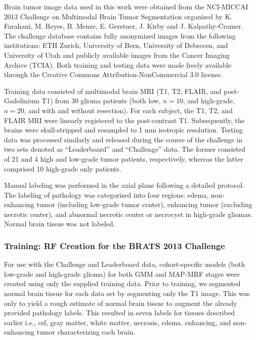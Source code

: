 Brain tumor image data used in this work were obtained from the NCI-MICCAI 2013 
Challenge on Multimodal Brain Tumor Segmentation
organized by K. Farahani, M. Reyes, B. Menze, E. Gerstner, J. Kirby and J. Kalpathy-Cramer. 
The challenge database contains fully anonymized images from the following institutions: 
ETH Zurich, University of Bern, University of Debrecen, and University of Utah and 
publicly available images from the Cancer Imaging Archive (TCIA).  Both training 
and testing data were made freely available through the Creative Commons Attribution-NonCommercial 3.0 license.

Training data consisted of multimodal brain MRI (T1, T2, FLAIR, and 
post-Gadolinium T1) from 30 glioma patients (both low, $n=10$, and high-grade, $n=20$,
and with and without resection).  For each subject, the T1, T2, and 
FLAIR MRI were linearly registered to the post-contrast T1.  Subsequently,
the brains were skull-stripped and resampled to 1 mm isotropic resolution.
Testing data was processed similarly and released during the course of the
challenge in two sets denoted as ``Leaderboard'' and ``Challenge'' data.  
The former consisted of 21 and 4 high and low-grade tumor patients, respectively,
whereas the latter comprised 10 high-grade only patients.

Manual labeling was performed in the axial plane following a detailed
protocol.
The labeling of pathology was categorized into four regions:
edema, non-enhancing tumor (including low-grade tumor center), 
enhancing tumor (excluding necrotic center), and abnormal
necrotic center or necrocyst in high-grade gliomas.
Normal brain tissue was not labeled. 

\subsubsection{Training: RF Creation for the BRATS 2013 Challenge}

For use with the Challenge and Leaderboard data, cohort-specific models (both 
low-grade and 
high-grade glioma) for both GMM and MAP-MRF stages were created using only the 
supplied training data.  Prior to training, we segmented normal brain tissue \citep{avants2011}
for each data set by segmenting only the T1 image.  This was only to yield
a rough estimate of normal brain tissue to augment the already provided 
pathology labels.  This resulted in seven labels for tissues described
earlier i.e., csf, gray matter, white matter,
necrosis, edema, enhancing, and non-enhancing tumor characterizing each brain.

